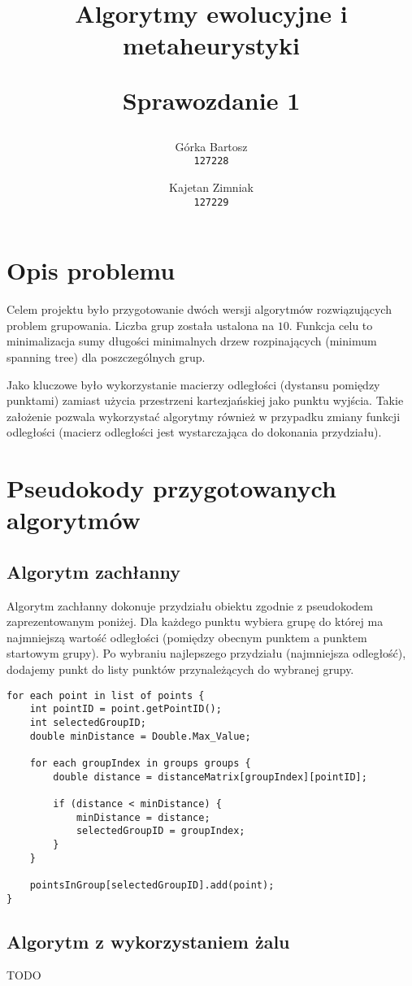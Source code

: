 \documentclass{mwart}
\title{
    \textbf{Algorytmy ewolucyjne i metaheurystyki}\\ 
    \begin{large} 
        Sprawozdanie 1
    \end{large}
}
\author{
    Górka Bartosz\\
  \texttt{127228}
  \and
  Kajetan Zimniak\\
  \texttt{127229}
}
\date{}
\begin{document}
\maketitle

\section{Opis problemu}
Celem projektu było przygotowanie dwóch wersji algorytmów rozwiązujących problem grupowania. Liczba grup została ustalona na $10$. Funkcja celu to minimalizacja sumy długości minimalnych drzew rozpinających (minimum spanning tree) dla poszczególnych grup.

Jako kluczowe było wykorzystanie macierzy odległości (dystansu pomiędzy punktami) zamiast użycia przestrzeni kartezjańskiej jako punktu wyjścia. Takie założenie pozwala wykorzystać algorytmy również w przypadku zmiany funkcji odległości (macierz odległości jest wystarczająca do dokonania przydziału).

\section{Pseudokody przygotowanych algorytmów}
\subsection{Algorytm zachłanny}
Algorytm zachłanny dokonuje przydziału obiektu zgodnie z pseudokodem zaprezentowanym poniżej. Dla każdego punktu wybiera grupę do której ma najmniejszą wartość odległości (pomiędzy obecnym punktem a punktem startowym grupy). Po wybraniu najlepszego przydziału (najmniejsza odległość), dodajemy punkt do listy punktów przynależących do wybranej grupy.

\begin{lstlisting}[style=JavaStyle]
for each point in list of points {
    int pointID = point.getPointID();
    int selectedGroupID;
    double minDistance = Double.Max_Value;

    for each groupIndex in groups groups {
        double distance = distanceMatrix[groupIndex][pointID];
        
        if (distance < minDistance) {
            minDistance = distance;
            selectedGroupID = groupIndex;
        }
    }

    pointsInGroup[selectedGroupID].add(point);
}
\end{lstlisting}

\subsection{Algorytm z wykorzystaniem żalu}
TODO
\end{document}
